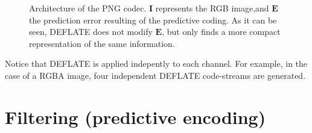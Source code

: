 \begin{figure}
  \centering
  \caption{Architecture of the PNG codec. ${\mathbf I}$ represents the
    RGB image,and ${\mathbf E}$ the prediction error resulting of the
    predictive coding. As it can be seen, DEFLATE does not modify
    ${\mathbf E}$, but only finds a more compact representation of the
    same information.}
\end{figure}

Notice that DEFLATE is applied indepently to each channel. For
example, in the case of a RGBA image, four independent DEFLATE
code-streams are generated.

\section{Filtering (predictive encoding)}
